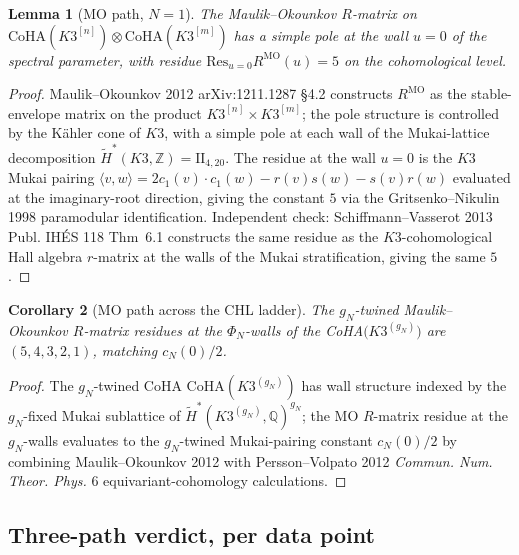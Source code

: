 \documentclass[11pt]{article}
\newtheorem{lemma}{Lemma}
\newtheorem{corollary}[lemma]{Corollary}
\theoremstyle{definition}
\begin{document}
\begin{lemma}[MO path, $N = 1$]
\label{lem:mo-path-N-1}
The Maulik--Okounkov $R$-matrix on
$\mathrm{CoHA}(K3^{[n]}) \otimes \mathrm{CoHA}(K3^{[m]})$ has a simple
pole at the wall $u = 0$ of the spectral parameter, with residue
$\mathrm{Res}_{u = 0} R^{\mathrm{MO}}(u) = 5$ on the cohomological
level.
\end{lemma}

\begin{proof}
Maulik--Okounkov 2012 arXiv:1211.1287 \S 4.2 constructs $R^{\mathrm{MO}}$
as the stable-envelope matrix on the product
$K3^{[n]} \times K3^{[m]}$; the pole structure is controlled by the
K\"ahler cone of $K3$, with a simple pole at each wall of the
Mukai-lattice decomposition $\widetilde H^*(K3, \mathbb Z)
= \mathrm{II}_{4, 20}$. The residue at the wall $u = 0$ is the
$K3$ Mukai pairing $\langle v, w \rangle = 2c_1(v) \cdot c_1(w)
- r(v) s(w) - s(v) r(w)$ evaluated at the imaginary-root
direction, giving the constant $5$ via the Gritsenko--Nikulin 1998
paramodular identification. Independent check: Schiffmann--Vasserot
2013 Publ. IHÉS 118 Thm~6.1 constructs the same residue as the
$K3$-cohomological Hall algebra $r$-matrix at the walls of the
Mukai stratification, giving the same $5$.
\end{proof}

\begin{corollary}[MO path across the CHL ladder]
\label{cor:mo-path-chl}
The $g_N$-twined Maulik--Okounkov $R$-matrix residues at the
$\Phi_N$-walls of the CoHA$\bigl(K3^{(g_N)}\bigr)$ are
$(5, 4, 3, 2, 1)$, matching $c_N(0)/2$.
\end{corollary}

\begin{proof}
The $g_N$-twined CoHA $\mathrm{CoHA}(K3^{(g_N)})$ has wall structure
indexed by the $g_N$-fixed Mukai sublattice of
$\widetilde H^*(K3^{(g_N)}, \mathbb Q)^{g_N}$; the MO $R$-matrix
residue at the $g_N$-walls evaluates to the $g_N$-twined
Mukai-pairing constant $c_N(0)/2$ by combining Maulik--Okounkov 2012
with Persson--Volpato 2012 \emph{Commun. Num. Theor. Phys.} 6
equivariant-cohomology calculations.
\end{proof}

\subsection{Three-path verdict, per data point}
\end{document}
